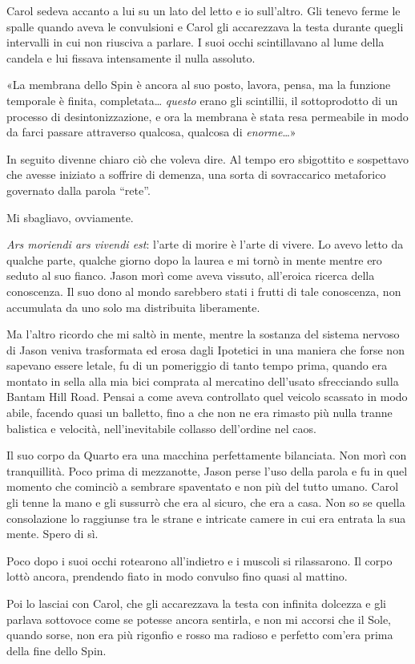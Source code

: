 Carol sedeva accanto a lui su un lato del letto e io sull'altro. Gli
tenevo ferme le spalle quando aveva le convulsioni e Carol gli
accarezzava la testa durante quegli intervalli in cui non riusciva a
parlare. I suoi occhi scintillavano al lume della candela e lui fissava
intensamente il nulla assoluto.

«La membrana dello Spin è ancora al suo posto, lavora, pensa, ma la
funzione temporale è finita, completata\ldots{} \emph{questo} erano gli
scintillii, il sottoprodotto di un processo di desintonizzazione, e ora
la membrana è stata resa permeabile in modo da farci passare attraverso
qualcosa, qualcosa di \emph{enorme}\ldots»

In seguito divenne chiaro ciò che voleva dire. Al tempo ero sbigottito e
sospettavo che avesse iniziato a soffrire di demenza, una sorta di
sovraccarico metaforico governato dalla parola ``rete''.

Mi sbagliavo, ovviamente.

\emph{Ars moriendi ars vivendi est}: l'arte di morire è l'arte di
vivere. Lo avevo letto da qualche parte, qualche giorno dopo la laurea e
mi tornò in mente mentre ero seduto al suo fianco. Jason morì come aveva
vissuto, all'eroica ricerca della conoscenza. Il suo dono al mondo
sarebbero stati i frutti di tale conoscenza, non accumulata da uno solo
ma distribuita liberamente.

Ma l'altro ricordo che mi saltò in mente, mentre la sostanza del sistema
nervoso di Jason veniva trasformata ed erosa dagli Ipotetici in una
maniera che forse non sapevano essere letale, fu di un pomeriggio di
tanto tempo prima, quando era montato in sella alla mia bici comprata al
mercatino dell'usato sfrecciando sulla Bantam Hill Road. Pensai a come
aveva controllato quel veicolo scassato in modo abile, facendo quasi un
balletto, fino a che non ne era rimasto più nulla tranne balistica e
velocità, nell'inevitabile collasso dell'ordine nel caos.

Il suo corpo da Quarto era una macchina perfettamente bilanciata. Non
morì con tranquillità. Poco prima di mezzanotte, Jason perse l'uso della
parola e fu in quel momento che cominciò a sembrare spaventato e non più
del tutto umano. Carol gli tenne la mano e gli sussurrò che era al
sicuro, che era a casa. Non so se quella consolazione lo raggiunse tra
le strane e intricate camere in cui era entrata la sua mente. Spero di
sì.

Poco dopo i suoi occhi rotearono all'indietro e i muscoli si
rilassarono. Il corpo lottò ancora, prendendo fiato in modo convulso
fino quasi al mattino.

Poi lo lasciai con Carol, che gli accarezzava la testa con infinita
dolcezza e gli parlava sottovoce come se potesse ancora sentirla, e non
mi accorsi che il Sole, quando sorse, non era più rigonfio e rosso ma
radioso e perfetto com'era prima della fine dello Spin.
